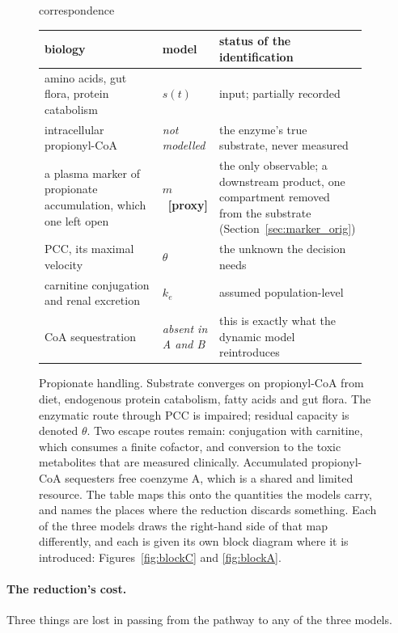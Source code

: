 \begin{figure}[htbp]
\begin{minipage}{\linewidth}
{\begin{tikzpicture}
\end{tikzpicture}}

\end{minipage}

correspondence
\vspace{1.1em}
{\footnotesize
\begin{tabular}{@{}p{0.44\linewidth} p{0.16\linewidth} p{0.34\linewidth}@{}}
\toprule
\textbf{biology} & \textbf{model} & \textbf{status of the identification} \\
\midrule
amino acids, gut flora, protein catabolism & $s(t)$ &
input; partially recorded \\
intracellular propionyl-CoA & \emph{not modelled} &
the enzyme's true substrate, never measured \\
a plasma marker of propionate accumulation, which one left open & $m$ \ \textbf{[proxy]} &
the only observable; a downstream product, one compartment removed from the
substrate (Section~\ref{sec:marker_orig}) \\
PCC, its maximal velocity & $\theta$ &
the unknown the decision needs \\
carnitine conjugation and renal excretion & $k_e$ &
assumed population-level \\
CoA sequestration & \emph{absent in A and B} &
this is exactly what the dynamic model reintroduces \\
\bottomrule
\end{tabular}}

\caption{Propionate handling. Substrate converges on propionyl-CoA from diet, endogenous
protein catabolism, fatty acids and gut flora. The enzymatic route through PCC is impaired;
residual capacity is denoted $\theta$. Two escape routes remain: conjugation with carnitine,
which consumes a finite cofactor, and conversion to the toxic metabolites that are measured
clinically. Accumulated propionyl-CoA sequesters free coenzyme A, which is a shared and
limited resource. The table maps this onto the quantities the models carry, and names the
places where the reduction discards something. Each of the three models draws the
right-hand side of that map differently, and each is given its own block diagram where it
is introduced: Figures~\ref{fig:blockC} and \ref{fig:blockA}.}
\label{fig:pathway}
\end{figure}

\paragraph{The reduction's cost.} Three things are lost in passing from the pathway
to any of the three models.

